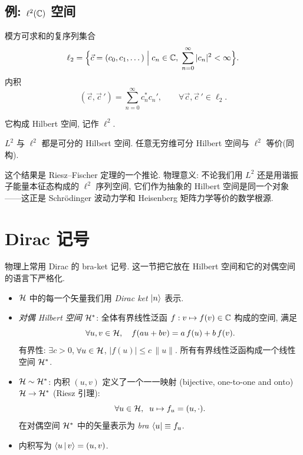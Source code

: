 \subsection{例: \texorpdfstring{$\ell^{2}(\mathbb{C})$}{ℓ²(C)} 空间}\label{subsec:l2-example}

\begin{definition}[$\ell^{2}$ 空间]
模方可求和的复序列集合
\begin{equation}
\ell_{2}=\Big\{\vec c=(c_0,c_1,\dots)\;\Big|\;c_n\in\mathbb{C},\;\sum_{n=0}^{\infty}|c_n|^{2}<\infty\Big\}.
\end{equation}
内积
\begin{equation}
(\vec c,\vec c\,')=\sum_{n=0}^{\infty}c_n^{*}c_n',\qquad \forall \vec c,\vec c\,'\in\ell_2.
\end{equation}
\end{definition}

它构成 Hilbert 空间, 记作 $\ell^{2}$.

\begin{theorem}\label{thm:l2-isomorphism}
$L^{2}$ 与 $\ell^{2}$ 都是可分的 Hilbert 空间. 任意无穷维可分 Hilbert 空间与 $\ell^{2}$ 等价(同构).
\end{theorem}

这个结果是 Riesz--Fischer 定理的一个推论. 物理意义: 不论我们用 $L^{2}$ 还是用谐振子能量本征态构成的 $\ell^{2}$ 序列空间, 它们作为抽象的 Hilbert 空间是同一个对象——这正是 Schr\"odinger 波动力学和 Heisenberg 矩阵力学等价的数学根源.

\section{Dirac 记号}\label{sec:dirac-notation}

物理上常用 Dirac 的 bra-ket 记号. 这一节把它放在 Hilbert 空间和它的对偶空间的语言下严格化.

\begin{itemize}
    \item $\mathcal{H}$ 中的每一个矢量我们用 \emph{Dirac ket} $\ket n$ 表示.
    \item \emph{对偶 Hilbert 空间} $\mathcal{H}^{*}$: 全体有界线性泛函 $f:v\mapsto f(v)\in\mathbb{C}$ 构成的空间, 满足
    \begin{equation}
    \forall u,v\in\mathcal{H},\quad f(au+bv)=a\,f(u)+b\,f(v).
    \end{equation}
    有界性: $\exists c>0$, $\forall u\in\mathcal{H}$, $|f(u)|\leq c\,\|u\|$. 所有有界线性泛函构成一个线性空间 $\mathcal{H}^{*}$.
    \item $\mathcal{H}\sim \mathcal{H}^{*}$: 内积 $(u,v)$ 定义了一个一一映射 (bijective, one-to-one and onto) $\mathcal{H}\to\mathcal{H}^{*}$ (Riesz 引理):
    \begin{equation}
    \forall u\in\mathcal{H},\;\; u\mapsto f_u=(u,\cdot).
    \end{equation}
    在对偶空间 $\mathcal{H}^{*}$ 中的矢量表示为 \emph{bra} $\bra u\equiv f_u$.
    \item 内积写为 $\left\langle u \,\middle|\, v \right\rangle=(u,v)$.
\end{itemize}

